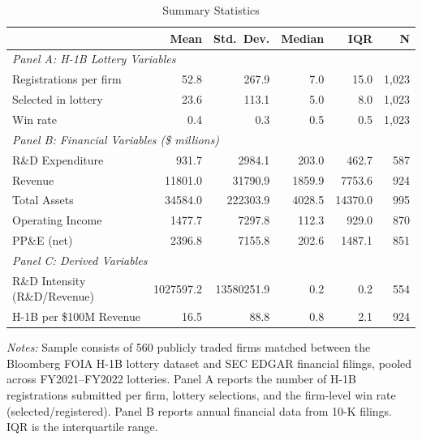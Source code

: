 \begin{table}[H]
\centering
\caption{Summary Statistics}
\label{tab:summary}
\begin{threeparttable}
\begin{tabular}{lrrrrr}
\toprule
 & Mean & Std.\ Dev. & Median & IQR & N \\
\midrule
\multicolumn{6}{l}{\emph{Panel A: H-1B Lottery Variables}} \\
Registrations per firm & 52.8 & 267.9 & 7.0 & 15.0 & 1,023 \\
Selected in lottery & 23.6 & 113.1 & 5.0 & 8.0 & 1,023 \\
Win rate & 0.4 & 0.3 & 0.5 & 0.5 & 1,023 \\
\midrule
\multicolumn{6}{l}{\emph{Panel B: Financial Variables (\$ millions)}} \\
R\&D Expenditure & 931.7 & 2984.1 & 203.0 & 462.7 & 587 \\
Revenue & 11801.0 & 31790.9 & 1859.9 & 7753.6 & 924 \\
Total Assets & 34584.0 & 222303.9 & 4028.5 & 14370.0 & 995 \\
Operating Income & 1477.7 & 7297.8 & 112.3 & 929.0 & 870 \\
PP\&E (net) & 2396.8 & 7155.8 & 202.6 & 1487.1 & 851 \\
\midrule
\multicolumn{6}{l}{\emph{Panel C: Derived Variables}} \\
R\&D Intensity (R\&D/Revenue) & 1027597.2 & 13580251.9 & 0.2 & 0.2 & 554 \\
H-1B per \$100M Revenue & 16.5 & 88.8 & 0.8 & 2.1 & 924 \\
\bottomrule
\end{tabular}
\begin{tablenotes}[flushleft]
\small
\item \emph{Notes:} Sample consists of 560 publicly traded firms matched between the Bloomberg FOIA H-1B lottery dataset and SEC EDGAR financial filings, pooled across FY2021--FY2022 lotteries. Panel A reports the number of H-1B registrations submitted per firm, lottery selections, and the firm-level win rate (selected/registered). Panel B reports annual financial data from 10-K filings. IQR is the interquartile range.
\end{tablenotes}
\end{threeparttable}
\end{table}
